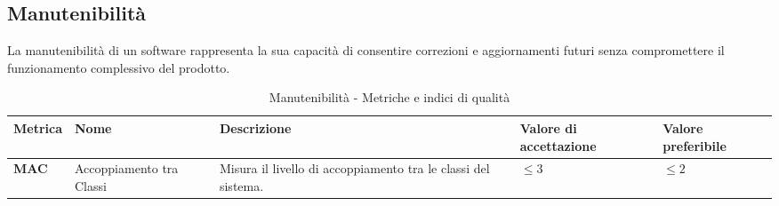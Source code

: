 \subsection{Manutenibilità}
La manutenibilità di un software rappresenta la sua capacità di consentire correzioni e aggiornamenti futuri senza compromettere il funzionamento complessivo del prodotto.  
\begin{table}[H]
    \centering
    \begin{tabular}{|C{1.5cm}|L{3cm}|L{4cm}|L{2.5cm}|L{2.5cm}|}
        \hline
        \textbf{Metrica} & \textbf{Nome} & \textbf{Descrizione} & \textbf{Valore di accettazione} & \textbf{Valore preferibile} \\
        \hline
        \textbf{MAC} & Accoppiamento tra Classi & Misura il livello di accoppiamento tra le classi del sistema. & $\leq 3$ & $\leq 2$ \\
        \hline
    \end{tabular}
    \caption{Manutenibilità - Metriche e indici di qualità}
    \label{tab:manutenibilità_qualita_prodotto}
\end{table}